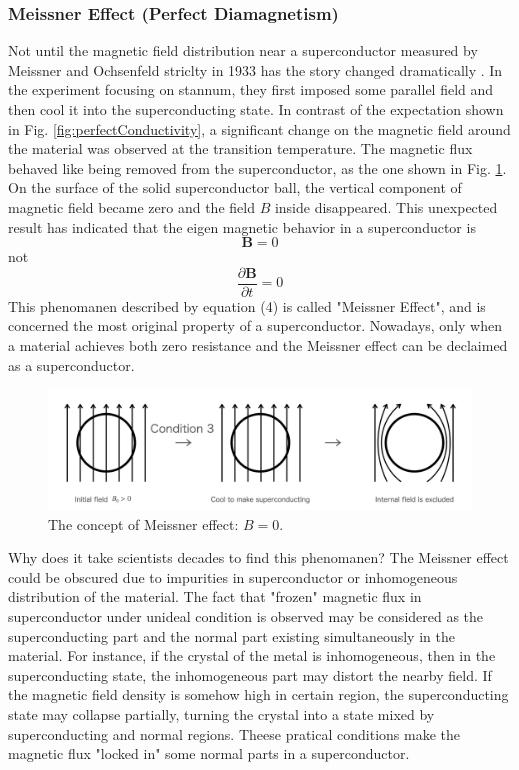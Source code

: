 \subsubsection{Meissner Effect (Perfect Diamagnetism)}
Not until the magnetic field distribution near a superconductor measured by Meissner and Ochsenfeld striclty in 1933 has the story changed dramatically \cite{2_5}.
In the experiment focusing on stannum,
they first imposed some parallel field and then cool it into the superconducting state.
In contrast of the expectation shown in Fig. \ref{fig:perfectConductivity},
a significant change on the magnetic field around the material was observed at the transition temperature.
The magnetic flux behaved like being removed from the superconductor,
as the one shown in Fig. \ref{fig:meissner}.
On the surface of the solid superconductor ball,
the vertical component of magnetic field became zero and the field $B$ inside disappeared.
This unexpected result has indicated that
the eigen magnetic behavior in a superconductor is
\begin{equation}
  {\bm B} = 0
\end{equation}
not
\begin{equation}
  \frac{\partial{\bm B}}{\partial t} = 0 \nonumber
\end{equation}
This phenomanen described by equation (4) is called "Meissner Effect",
and is concerned the most original property of a superconductor.
Nowadays, only when a material achieves both zero resistance and the Meissner effect can be declaimed as a superconductor.
\begin{figure}[H]
  \includegraphics[width=18.5cm, bb=9 9 900 260]{./section2Proposal/meissner.png}
  \caption{The concept of Meissner effect: $B = 0$.}
  \label{fig:meissner}
\end{figure}

Why does it take scientists decades to find this phenomanen?
The Meissner effect could be obscured due to impurities in superconductor or inhomogeneous distribution of the material.
The fact that "frozen" magnetic flux in superconductor under unideal condition is observed
may be considered as the superconducting part and the normal part existing simultaneously in the material.
For instance, if the crystal of the metal is inhomogeneous, then in the superconducting state, the inhomogeneous part may distort the nearby field.
If the magnetic field density is somehow high in certain region,
the superconducting state may collapse partially,
turning the crystal into a state mixed by superconducting and normal regions.
Theese pratical conditions make the magnetic flux "locked in" some normal parts in a superconductor.

